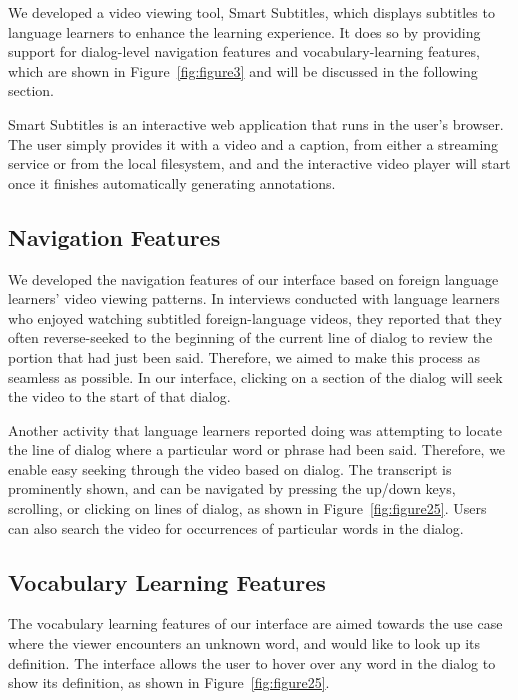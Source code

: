\documentclass{sigchi}
\begin{document}
We developed a video viewing tool, Smart Subtitles, which displays subtitles to language learners to enhance the learning experience. It does so by providing support for dialog-level navigation features and vocabulary-learning features, which are shown in Figure~\ref{fig:figure3} and will be discussed in the following section. %

Smart Subtitles is an interactive web application that runs in the user's browser. The user simply provides it with a video and a caption, from either a streaming service or from the local filesystem, and
and the interactive video player will start once it finishes automatically
generating annotations.

\subsection{Navigation Features}

We developed the navigation features of our interface based
on foreign language learners’ video viewing patterns. In
interviews conducted with language learners who enjoyed
watching subtitled foreign-language videos, they reported
that they often reverse-seeked to the beginning of the current
line of dialog to review the portion that had just been said.
Therefore, we aimed to make this process as seamless as possible.
In our interface, clicking on a section of the dialog will
seek the video to the start of that dialog.

Another activity that language learners reported doing was attempting to locate the line of dialog where a particular word or phrase had been said. Therefore, we enable easy seeking through the video based on dialog. The transcript is prominently shown, and can be navigated by pressing the up/down keys, scrolling, or clicking on lines of dialog, as shown in Figure~\ref{fig:figure25}. Users can also search the video for occurrences of particular words in the dialog.

\subsection{Vocabulary Learning Features}

The vocabulary learning features of our interface are aimed towards the use case where the viewer encounters an unknown word, and would like to look up its definition. The interface allows the user to hover over any word in
the dialog to show its definition, as shown in Figure~\ref{fig:figure25}.
\end{document}
